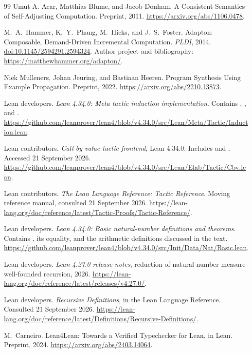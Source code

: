 \begin{thebibliography}{99}
 Umut A. Acar, Matthias Blume, and Jacob Donham. A Consistent Semantics of
Self-Adjusting Computation. Preprint, 2011.
\url{https://arxiv.org/abs/1106.0478}.

 M.~A.~Hammer, K.~Y.~Phang, M.~Hicks, and J.~S.~Foster.
Adapton: Composable, Demand-Driven Incremental Computation.
\emph{PLDI}, 2014.
\href{https://doi.org/10.1145/2594291.2594324}{doi:10.1145/2594291.2594324}.
Author project and bibliography: \url{https://matthewhammer.org/adapton/}.

 Niek Mulleners, Johan Jeuring, and Bastiaan Heeren. Program Synthesis Using
Example Propagation. Preprint, 2022.
\url{https://arxiv.org/abs/2210.13873}.

 Lean developers.
\emph{Lean 4.34.0: Meta tactic induction implementation}.
Contains , , and .
\url{https://github.com/leanprover/lean4/blob/v4.34.0/src/Lean/Meta/Tactic/Induction.lean}.

 Lean contributors. \emph{Call-by-value tactic frontend}, Lean 4.34.0.
Includes  and . Accessed 21 September 2026.
\url{https://github.com/leanprover/lean4/blob/v4.34.0/src/Lean/Elab/Tactic/Cbv.lean}.

 Lean contributors. \emph{The Lean Language Reference: Tactic Reference}.
Moving reference manual, consulted 21 September 2026.
\url{https://lean-lang.org/doc/reference/latest/Tactic-Proofs/Tactic-Reference/}.

 Lean developers.
\emph{Lean 4.34.0: Basic natural-number definitions and theorems}.
Contains , its  equality, and the arithmetic definitions discussed in the text.
\url{https://github.com/leanprover/lean4/blob/v4.34.0/src/Init/Data/Nat/Basic.lean}.

 Lean developers.
\emph{Lean 4.27.0 release notes}, reduction of natural-number-measure well-founded recursion, 2026.
\url{https://lean-lang.org/doc/reference/latest/releases/v4.27.0/}.

 Lean developers.
\emph{Recursive Definitions}, in the Lean Language Reference.
Consulted 21 September 2026.
\url{https://lean-lang.org/doc/reference/latest/Definitions/Recursive-Definitions/}.

 M.~Carneiro. Lean4Lean: Towards a Verified Typechecker for Lean, in Lean.
Preprint, 2024. \url{https://arxiv.org/abs/2403.14064}.


\end{thebibliography}
